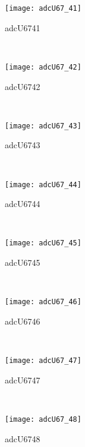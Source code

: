 \begin{figure}[h]
    \centering
    \begin{subfigure}[h]{0.3\textwidth}
        \centering
        \texttt{[image: adcU67\_41]}
        \caption{adcU6741}
        \label{fig:adcU67_41}
    \end{subfigure}
    ~
    \begin{subfigure}[h]{0.3\textwidth}
        \centering
        \texttt{[image: adcU67\_42]}
        \caption{adcU6742}
        \label{fig:adcU67_42}
    \end{subfigure}
    ~
    \begin{subfigure}[h]{0.3\textwidth}
        \centering
        \texttt{[image: adcU67\_43]}
        \caption{adcU6743}
        \label{fig:adcU67_43}
    \end{subfigure}
    \\
    \begin{subfigure}[h]{0.3\textwidth}
        \centering
        \texttt{[image: adcU67\_44]}
        \caption{adcU6744}
        \label{fig:adcU67_44}
    \end{subfigure}
    ~
    \begin{subfigure}[h]{0.3\textwidth}
        \centering
        \texttt{[image: adcU67\_45]}
        \caption{adcU6745}
        \label{fig:adcU67_45}
    \end{subfigure}
    ~
    \begin{subfigure}[h]{0.3\textwidth}
        \centering
        \texttt{[image: adcU67\_46]}
        \caption{adcU6746}
        \label{fig:adcU67_46}
    \end{subfigure}
    \\
    \begin{subfigure}[h]{0.3\textwidth}
        \centering
        \texttt{[image: adcU67\_47]}
        \caption{adcU6747}
        \label{fig:adcU67_47}
    \end{subfigure}
    ~
    \begin{subfigure}[h]{0.3\textwidth}
        \centering
        \texttt{[image: adcU67\_48]}
        \caption{adcU6748}
        \label{fig:adcU67_48}
    \end{subfigure}
    ~
    \begin{subfigure}[h]{0.3\textwidth}

\end{subfigure}
\end{figure}
